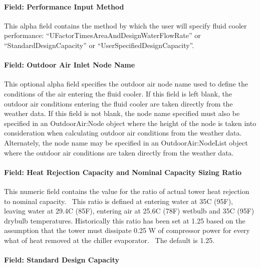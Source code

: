 \paragraph{Field: Performance Input Method}\label{field-performance-input-method-3}

This alpha field contains the method by which the user will specify fluid cooler performance: ``UFactorTimesAreaAndDesignWaterFlowRate'' or ``StandardDesignCapacity'' or ``UserSpecifiedDesignCapacity''.

\paragraph{Field: Outdoor Air Inlet Node Name}\label{field-outdoor-air-inlet-node-name-4}

This optional alpha field specifies the outdoor air node name used to define the conditions of the air entering the fluid cooler. If this field is left blank, the outdoor air conditions entering the fluid cooler are taken directly from the weather data. If this field is not blank, the node name specified must also be specified in an OutdoorAir:Node object where the height of the node is taken into consideration when calculating outdoor air conditions from the weather data. Alternately, the node name may be specified in an OutdoorAir:NodeList object where the outdoor air conditions are taken directly from the weather data.

\paragraph{Field: Heat Rejection Capacity and Nominal Capacity Sizing Ratio}\label{field-heat-rejection-capacity-and-nominal-capacity-sizing-ratio-3}

This numeric field contains the value for the ratio of actual tower heat rejection to nominal capacity.~ This ratio is defined at entering water at 35C (95F), leaving water at 29.4C (85F), entering air at 25.6C (78F) wetbulb and 35C (95F) drybulb temperatures. Historically this ratio has been set at 1.25 based on the assumption that the tower must dissipate 0.25 W of compressor power for every what of heat removed at the chiller evaporator.~ The default is 1.25.

\paragraph{Field: Standard Design Capacity}\label{field-standard-design-capacity}

